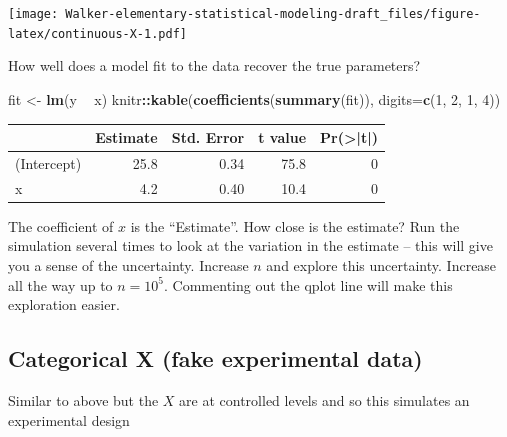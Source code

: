\documentclass[]{book}
\newenvironment{Shaded}{\begin{snugshade}}{\end{snugshade}}
\newcommand{\KeywordTok}[1]{\textcolor[rgb]{0.13,0.29,0.53}{\textbf{#1}}}
\newcommand{\DataTypeTok}[1]{\textcolor[rgb]{0.13,0.29,0.53}{#1}}
\newcommand{\DecValTok}[1]{\textcolor[rgb]{0.00,0.00,0.81}{#1}}
\newcommand{\StringTok}[1]{\textcolor[rgb]{0.31,0.60,0.02}{#1}}
\newcommand{\OperatorTok}[1]{\textcolor[rgb]{0.81,0.36,0.00}{\textbf{#1}}}
\newcommand{\NormalTok}[1]{#1}
\begin{document}
\texttt{[image: Walker-elementary-statistical-modeling-draft\_files/figure-latex/continuous-X-1.pdf]}

How well does a model fit to the data recover the true parameters?

\begin{Shaded}
\begin{Highlighting}[]
\NormalTok{fit <-}\StringTok{ }\KeywordTok{lm}\NormalTok{(y }\OperatorTok{~}\StringTok{ }\NormalTok{x)}
\NormalTok{knitr}\OperatorTok{::}\KeywordTok{kable}\NormalTok{(}\KeywordTok{coefficients}\NormalTok{(}\KeywordTok{summary}\NormalTok{(fit)), }\DataTypeTok{digits=}\KeywordTok{c}\NormalTok{(}\DecValTok{1}\NormalTok{, }\DecValTok{2}\NormalTok{, }\DecValTok{1}\NormalTok{, }\DecValTok{4}\NormalTok{))}
\end{Highlighting}
\end{Shaded}

\begin{tabular}{l|r|r|r|r}
\hline
  & Estimate & Std. Error & t value & Pr(>|t|)\\
\hline
(Intercept) & 25.8 & 0.34 & 75.8 & 0\\
\hline
x & 4.2 & 0.40 & 10.4 & 0\\
\hline
\end{tabular}

The coefficient of \(x\) is the ``Estimate''. How close is the estimate?
Run the simulation several times to look at the variation in the
estimate -- this will give you a sense of the uncertainty. Increase
\(n\) and explore this uncertainty. Increase all the way up to
\(n=10^5\). Commenting out the qplot line will make this exploration
easier.

\subsection{Categorical X (fake experimental
data)}\label{categorical-x-fake-experimental-data}

Similar to above but the \(X\) are at controlled levels and so this
simulates an experimental design
\end{document}
